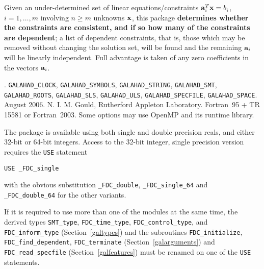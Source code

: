 \documentclass{galahad}
\newcommand{\packagename}{FDC}
\newcommand{\fullpackagename}{\libraryname\_\-\packagename}
\begin{document}
\galheader


\galsummary
Given an under-determined set of linear equations/constraints
${\mathbf{a}}_i^T {\mathbf{x}} = b_i^{}$,
$i = 1, \ldots, m$ involving $n \geq m$ unknowns ${\mathbf{x}}$, this package
{\bf determines whether the constraints are consistent, and if so how many
of the constraints are dependent}; a list of dependent constraints, that
is, those which may be removed without changing the solution set, will be found
and the remaining ${\mathbf{a}}_i$ will be linearly independent.
Full advantage is taken of any zero coefficients in the vectors ${\mathbf{a}}_i$.


\galattributes
\galversions{\tt  \fullpackagename\_single, \fullpackagename\_double}.
\galuses
{\tt GALAHAD\_\-CLOCK},
{\tt GALAHAD\_SY\-M\-BOLS}, {\tt GALAHAD\_\-STRING},
{\tt GALAHAD\_SMT}, {\tt GALAHAD\_\-ROOTS}, {\tt GALAHAD\_\-SLS},
{\tt GALAHAD\_\-ULS}, {\tt GALAHAD\_SPECFILE}, {\tt GALAHAD\-\_SPACE}.
\galdate August  2006.
\galorigin N. I. M. Gould, Rutherford Appleton Laboratory.
\gallanguage Fortran~95 + TR 15581 or Fortran~2003.
\galparallelism Some options may use OpenMP and its runtime library.


\galhowto

The package is available using both single and double precision reals, 
and either 32-bit or 64-bit integers. Access to the 32-bit integer,
single precision version requires the {\tt USE} statement
\medskip

\hspace{8mm} {\tt USE \fullpackagename\_single}

\medskip
\noindent
with the obvious substitution {\tt \fullpackagename\_double},
{\tt \fullpackagename\_single\_64} and 
{\tt \fullpackagename\_double\_64} for the other variants.

\noindent
If it is required to use more than one of the modules at the same time, 
the derived types
{\tt SMT\_type},
{\tt \packagename\_time\_type},
{\tt \packagename\_control\_type},
and
{\tt \packagename\_inform\_type}
(Section~\ref{galtypes})
and the subroutines
{\tt \packagename\_initialize},
{\tt \packagename\_\-find\_dependent},
{\tt \packagename\_terminate}
(Section~\ref{galarguments})
and
{\tt \packagename\_read\_specfile}
(Section~\ref{galfeatures})
must be renamed on one of the {\tt USE} statements.
\end{document}
